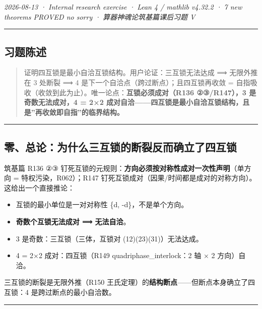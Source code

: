\documentclass[
]{article}
\providecommand{\tightlist}{%
  \setlength{\itemsep}{0pt}\setlength{\parskip}{0pt}}
\begin{document}
\emph{2026-08-13 · Internal research exercise · Lean 4 / mathlib v4.32.2
· 7 new theorems PROVED no sorry · 算器神魂论筑基篇课后习题 V }

\begin{center}\rule{0.5\linewidth}{0.5pt}\end{center}

\subsection{习题陈述}\label{ux4e60ux9898ux9648ux8ff0}

\begin{quote}
证明四互锁是最小自洽互锁结构。用户论证：三互锁无法达成 ⟹ 无限外推在 3
处断裂 ⟹ 4 是下一个自洽点（跨过断点）；且四互锁再收敛 =
自指吸收（收敛到此为止）。唯一论点：\textbf{互锁必须成对（R136
②③/R147），3 是奇数无法成对，4 = 2×2
成对自洽------四互锁是最小自洽互锁结构，且是''再收敛即自指''的临界结构。}
\end{quote}

\begin{center}\rule{0.5\linewidth}{0.5pt}\end{center}

\subsection{零、总论：为什么三互锁的断裂反而确立了四互锁}\label{ux96f6ux603bux8bbaux4e3aux4ec0ux4e48ux4e09ux4e92ux9501ux7684ux65adux88c2ux53cdux800cux786eux7acbux4e86ux56dbux4e92ux9501}

筑基篇 R136 ②③
钉死互锁的元规则：\textbf{方向必须按对称性成对一次性声明}（单方向 =
特权污染，R062）；R147
钉死互锁成对（因果/时间都是成对的对称方向）。这给出一个直接推论：

\begin{itemize}
\tightlist
\item
  互锁的最小单位是一对对称性 \{d, -d\}，不是单个方向。
\item
  \textbf{奇数个互锁无法成对 ⟹ 无法自洽}。
\item
  3 是奇数：三互锁（三体，互锁对 (12)(23)(31)）无法达成。
\item
  4 = 2×2 成对：四互锁（R149 quadriphase\_interlock：2 轴 × 2
  方向）自洽。
\end{itemize}

三互锁的断裂是无限外推（R150
王氏定理）的\textbf{结构断点}------但断点本身确立了四互锁：4
是跨过断点的最小自洽数。

\begin{center}\rule{0.5\linewidth}{0.5pt}\end{center}
\end{document}
